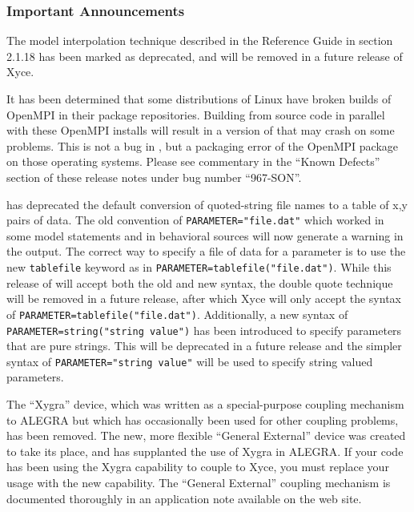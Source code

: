 \documentclass[letterpaper]{scrartcl}
\begin{document}
\subsubsection*{Important Announcements}
\begin{XyceItemize}
\item The model interpolation technique described in the \Xyce{}
  Reference Guide in section 2.1.18 has been marked as deprecated, and
  will be removed in a future release of Xyce.
\item It has been determined that some distributions of Linux have
  broken builds of OpenMPI in their package repositories.  Building
  \Xyce{} from source code in parallel with these OpenMPI installs
  will result in a version of \Xyce{} that may crash on some problems.
  This is not a bug in \Xyce{}, but a packaging error of the OpenMPI
  package on those operating systems.  Please see commentary in the
  ``Known Defects'' section of these release notes under bug number
  ``967-SON''.
\item \Xyce{} has deprecated the default conversion of quoted-string file
  names to a table of x,y pairs of data.  The old convention of
  \texttt{PARAMETER="file.dat"} which worked in some model statements
  and in behavioral sources will now generate a warning in the \Xyce{}
  output.  The correct way to specify a file of data for a parameter
  is to use the new \texttt{tablefile} keyword as in
  \texttt{PARAMETER=tablefile("file.dat")}.  While this release of
  \Xyce{} will accept both the old and new syntax, the double quote
  technique will be removed in a future release, after which Xyce
  will only accept the syntax of
  \texttt{PARAMETER=tablefile("file.dat")}.  Additionally, a new
  syntax of \texttt{PARAMETER=string("string value")} has been
  introduced to specify parameters that are pure strings.  This will
  be deprecated in a future release and the simpler syntax of
  \texttt{PARAMETER="string value"} will be used to specify string
  valued parameters.
\item The ``Xygra'' device, which was written as a special-purpose
  coupling mechanism to ALEGRA but which has occasionally been used
  for other coupling problems, has been removed.  The new, more
  flexible ``General External'' device was created to take its place,
  and has supplanted the use of Xygra in ALEGRA.  If your code has
  been using the Xygra capability to couple to Xyce, you must replace
  your usage with the new capability.  The ``General External''
  coupling mechanism is documented thoroughly in an application note
  available on the \Xyce{} web site.
\end{XyceItemize}
\end{document}
